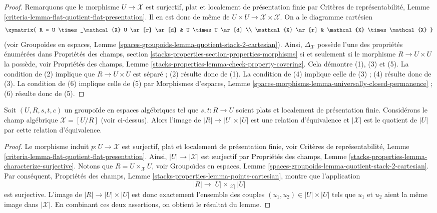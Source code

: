 \begin{proof}
Remarquons que le morphisme $U \to \mathcal{X}$ est surjectif, plat et
localement de présentation finie par Critères de représentabilité, Lemme
\ref{criteria-lemma-flat-quotient-flat-presentation}.
Il en est donc de même de
$U \times U \to \mathcal{X} \times \mathcal{X}$. On a le diagramme cartésien
$$
\xymatrix{
R  = U \times_\mathcal{X} U \ar[r] \ar[d] & U \times U \ar[d] \\
\mathcal{X} \ar[r] & \mathcal{X} \times \mathcal{X}
}
$$
(voir Groupoïdes en espaces, Lemme
\ref{spaces-groupoids-lemma-quotient-stack-2-cartesian}).
Ainsi, $\Delta_\mathcal{X}$ possède l'une des propriétés énumérées dans
Propriétés des champs, section
\ref{stacks-properties-section-properties-morphisms}
si et seulement si le morphisme $R \to U \times U$ la possède, voir
Propriétés des champs, Lemme
\ref{stacks-properties-lemma-check-property-covering}.
Cela démontre (1), (3) et (5).
La condition de (2) implique que $R \to U \times U$ est séparé ; (2) résulte
donc de (1). La condition de (4) implique celle de (3) ; (4) résulte donc de
(3). La condition de (6) implique celle de (5) par Morphismes d'espaces, Lemme
\ref{spaces-morphisms-lemma-universally-closed-permanence} ; (6) résulte donc
de (5).
\end{proof}

\begin{lemma}
\label{lemma-points-presentation}
Soit $(U, R, s, t, c)$ un groupoïde en espaces algébriques tel que
$s, t : R \to U$ soient plats et localement de présentation finie.
Considérons le champ algébrique $\mathcal{X} = [U/R]$ (voir ci-dessus).
Alors l'image de $|R| \to |U| \times |U|$ est une relation d'équivalence et
$|\mathcal{X}|$ est le quotient de $|U|$ par cette relation d'équivalence.
\end{lemma}

\begin{proof}
Le morphisme induit $p : U \to \mathcal{X}$ est surjectif, plat et localement
de présentation finie, voir Critères de représentabilité, Lemme
\ref{criteria-lemma-flat-quotient-flat-presentation}.
Ainsi, $|U| \to |\mathcal{X}|$ est surjectif par Propriétés des champs, Lemme
\ref{stacks-properties-lemma-characterize-surjective}.
Notons que $R = U \times_\mathcal{X} U$, voir Groupoïdes en espaces,
Lemme \ref{spaces-groupoids-lemma-quotient-stack-2-cartesian}.
Par conséquent, Propriétés des champs,
Lemme \ref{stacks-properties-lemma-points-cartesian}, montre que l'application
$$
|R| \longrightarrow |U| \times_{|\mathcal{X}|} |U|
$$
est surjective. L'image de $|R| \to |U| \times |U|$ est donc exactement
l'ensemble des couples $(u_1, u_2) \in |U| \times |U|$ tels que $u_1$ et
$u_2$ aient la même image dans $|\mathcal{X}|$.
En combinant ces deux assertions, on obtient le résultat du lemme.
\end{proof}






